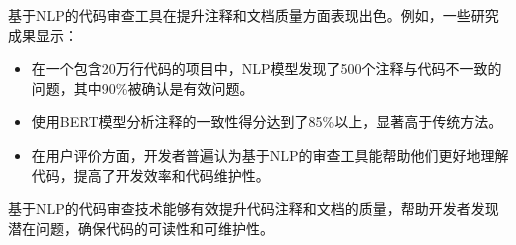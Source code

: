\documentclass{article}
\begin{document}
基于NLP的代码审查工具在提升注释和文档质量方面表现出色。例如，一些研究成果显示：

\begin{itemize}
    \item 在一个包含20万行代码的项目中，NLP模型发现了500个注释与代码不一致的问题，其中90\%被确认是有效问题。
    \item 使用BERT模型分析注释的一致性得分达到了85\%以上，显著高于传统方法。
    \item 在用户评价方面，开发者普遍认为基于NLP的审查工具能帮助他们更好地理解代码，提高了开发效率和代码维护性。
\end{itemize}

基于NLP的代码审查技术能够有效提升代码注释和文档的质量，帮助开发者发现潜在问题，确保代码的可读性和可维护性。
\end{document}
